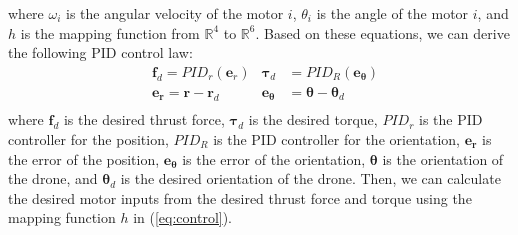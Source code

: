 where $\omega_i$ is the angular velocity of the motor $i$, 
$\theta_i$ is the angle of the motor $i$, 
and $h$ is the mapping function from $\mathbb{R}^4$ to $\mathbb{R}^6$.
Based on these equations, we can derive the following PID control law:
\begin{equation}
  \begin{aligned}
    &\bm{f}_d = {PID}_r(\bm{e}_r)
    &\bm{\tau}_d &= {PID}_R(\bm{e_\theta})\\
    &\bm{e_r} = \bm{r} - \bm{r}_d
    &\bm{e_\theta} &= \bm{\theta} - \bm{\theta}_d\\
  \end{aligned}
\end{equation}
where $\bm{f}_d$ is the desired thrust force, 
$\bm{\tau}_d$ is the desired torque, 
$PID_r$ is the PID controller for the position, 
$PID_R$ is the PID controller for the orientation, 
$\bm{e_r}$ is the error of the position, 
$\bm{e_\theta}$ is the error of the orientation, 
$\bm{\theta}$ is the orientation of the drone, 
and $\bm{\theta}_d$ is the desired orientation of the drone.
Then, we can calculate the desired motor inputs from the desired thrust force and torque using the mapping function $h$ in (\ref{eq:control}).
